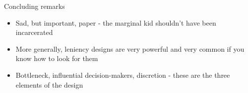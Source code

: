\documentclass{beamer}
\begin{document}
\begin{frame}{Concluding remarks}

	\begin{itemize}
	\item Sad, but important, paper - the marginal kid shouldn't have been incarcerated
	\item More generally, leniency designs are very powerful and very common if you know how to look for them
	\item Bottleneck, influential decision-makers, discretion - these are the three elements of the design
	\end{itemize}

\end{frame}
\end{document}
